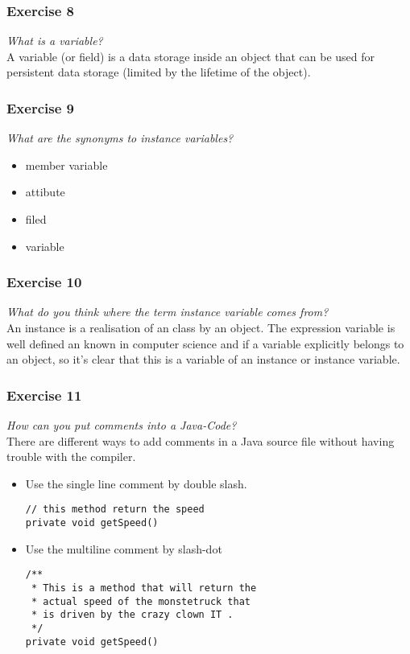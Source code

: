 \subsubsection*{Exercise 8}
\textit{What is a variable?}\\

A variable (or field) is a data storage inside an object that can be used for
persistent data storage (limited by the lifetime of the object).

\subsubsection*{Exercise 9}
\textit{What are the synonyms to instance variables?}\\

\begin{itemize}
	\item member variable
	\item attibute
	\item filed
	\item variable
\end{itemize}

\subsubsection*{Exercise 10}
\textit{What do you think where the term instance variable comes from?}\\

An instance is a realisation of an class by an object. The expression variable
is well defined an known in computer science and if a variable explicitly
belongs to an object, so it's clear that this is a variable of an instance or
instance variable.

\subsubsection*{Exercise 11}
\textit{How can you put comments into a Java-Code?}\\

There are different ways to add comments in a Java source file without having
trouble with the compiler.

\begin{itemize} 
	\item Use the single line comment by double slash.
\begin{lstlisting}
// this method return the speed
private void getSpeed()
\end{lstlisting}
	\item Use the multiline comment by slash-dot
\begin{lstlisting}
/**
 * This is a method that will return the
 * actual speed of the monstetruck that
 * is driven by the crazy clown IT .
 */
private void getSpeed()
\end{lstlisting}
\end{itemize}

